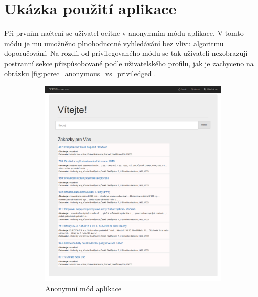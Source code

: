 \documentclass[thesis=M,czech]{FITthesis}[2019/12/23]
\begin{document}
\section{Ukázka použití aplikace}
Při prvním načtení se uživatel ocitne v anonymním módu aplikace. V tomto módu je mu umožněno plnohodnotné vyhledávání bez vlivu algoritmu doporučování. Na rozdíl od privilegovaného módu se tak uživateli nezobrazují postranní sekce přizpůsobované podle uživatelského profilu, jak je zachyceno na obrázku \ref{fig:pcrec_anonymous_vs_priviledged}.
\begin{figure}[!h]
\centering
\begin{subfigure}{.5\textwidth}
  \centering
	\includegraphics[width=\textwidth]{images/pcrec/pcrec_anonymous.png}
	\caption{Anonymní mód aplikace}\label{fig:pcrec_anonymous}
\end{subfigure}%
\begin{subfigure}{.5\textwidth}
  \centering

\end{subfigure}
\end{figure}
\end{document}
